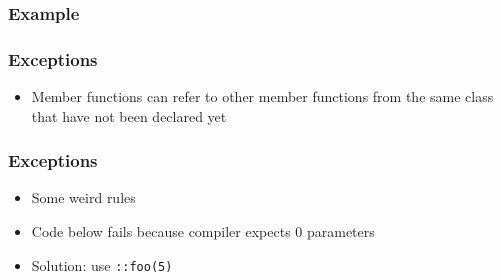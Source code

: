 \documentclass{../ucll-slides}
\begin{document}
\begin{frame}
  \frametitle{Example}
  \begin{overprint}
  \end{overprint}
\end{frame}

\begin{frame}
  \frametitle{Exceptions}
  \begin{itemize}
    \item Member functions can refer to other member functions
          from the same class that have not been declared yet
  \end{itemize}
\end{frame}

\begin{frame}
  \frametitle{Exceptions}
  \begin{itemize}
    \item Some weird rules
    \item Code below fails because compiler expects 0 parameters
    \item Solution: use {\tt ::foo(5)}
  \end{itemize}
\end{frame}
\end{document}

